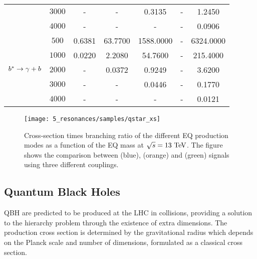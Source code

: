 \begin{table}[ht!]
{\begin{tabular}{lcccccc}
            & $3000$    & -             & -         & 0.3135        & -         & 1.2450        \\
            & $4000$    & -             & -         & -             & -         & 0.0906        \\
            \midrule
            \multirow{5}{*}{\(b^{*} \rightarrow \gamma + b\)}
            & $500$     & 0.6381        & 63.7700   & 1588.0000     & -         & 6324.0000     \\
            & $1000$    & 0.0220        & 2.2080    & 54.7600       & -         & 215.4000      \\
            & $2000$    & -             & 0.0372    & 0.9249        & -         & 3.6200        \\
            & $3000$    & -             & -         & 0.0446        & -         & 0.1770        \\
            & $4000$    & -             & -         & -             & -         & 0.0121        \\
            \bottomrule
        \end{tabular}
    }
    \label{tab:samples:samples:sig:qstar:xs}
\end{table}

\begin{figure}[ht!]
    \centering
    \texttt{[image: 5\_resonances/samples/qstar\_xs]}
    \caption{Cross-section times branching ratio of the different \ac{EQ} production modes as a function of the \ac{EQ} mass at \(\sqrt{s}=13~\text{TeV}\). The figure shows the comparison between \qstar (blue), \cstar (orange) and \bstar (green) signals using three different couplings.}
    \label{fig:samples:samples:sig:qstar:xs}
\end{figure}


\subsection{Quantum Black Holes}
\label{subsec:samples:samples:sig:qbh}

\ac{QBH} are predicted to be produced at the \ac{LHC} in \pp collisions, providing a solution to the hierarchy problem through the existence of extra dimensions. 
The production cross section is determined by the gravitational radius which depends on the Planck scale and number of dimensions, formulated as a classical cross section.


